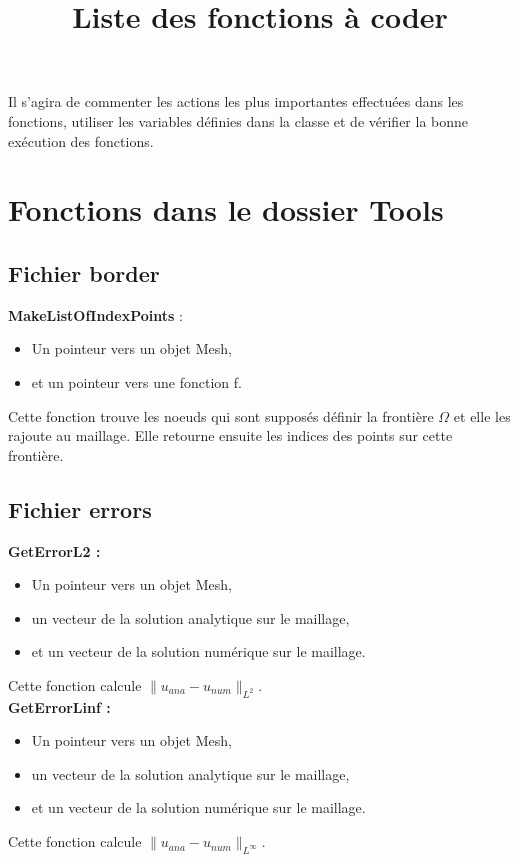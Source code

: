 \documentclass[french]{article}
\newcommand{\elodie}{\hfill{\color{red}{Élodie}}}
\newcommand{\alexis}{\hfill{\color{green}{Alexis}}}
\begin{document}
\title{Liste des fonctions à coder}

\maketitle

Il s'agira de commenter les actions les plus importantes effectuées dans les fonctions, utiliser les variables définies dans la classe et de vérifier la bonne exécution des fonctions.

\section{Fonctions dans le dossier Tools}
\subsection{Fichier border}
\textbf{MakeListOfIndexPoints} :\alexis
\begin{itemize}
\item Un pointeur vers un objet Mesh,
\item et un pointeur vers une fonction f.
\end{itemize}
Cette fonction trouve les noeuds qui sont supposés définir la frontière $\Omega$ et elle les rajoute au maillage. Elle retourne ensuite les indices des points sur cette frontière.

\subsection{Fichier errors}
\textbf{GetErrorL2 :}\elodie
\begin{itemize}
\item Un pointeur vers un objet Mesh,
\item un vecteur de la solution analytique sur le maillage,
\item et un vecteur de la solution numérique sur le maillage.
\end{itemize}
Cette fonction calcule $\|u_{ana} - u_{num}\|_{L^2}$.\\

\textbf{GetErrorLinf :}\elodie
\begin{itemize}
\item Un pointeur vers un objet Mesh,
\item un vecteur de la solution analytique sur le maillage,
\item et un vecteur de la solution numérique sur le maillage.
\end{itemize}
Cette fonction calcule $\|u_{ana} - u_{num}\|_{L^\infty}$.\\
\end{document}

